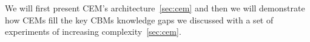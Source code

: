 We will first present CEM's architecture~\ref{sec:cem} and then we will demonstrate how CEMs fill the key CBMs knowledge gaps we discussed with a set of experiments of increasing complexity~\ref{sec:cem}.

%
%


%
%

